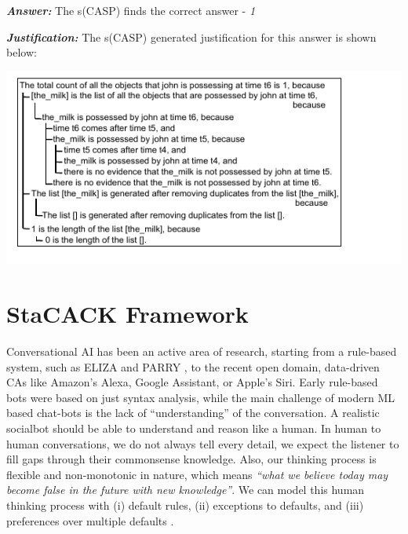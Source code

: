 \documentclass[letterpaper]{article}
\begin{document}
\smallskip
\noindent \textit{\textbf{Answer: }} The s(CASP) finds the correct answer - \textit{1}


\noindent \textit{\textbf{Justification: }}
The s(CASP) generated justification for this answer is shown below:

\smallskip

\noindent
\hbox {\hspace{-0.8em}\includegraphics [scale = 1.12]{justification.pdf}}


\section{StaCACK Framework}
Conversational AI has been an active area of research, starting from a rule-based system, such as ELIZA \cite{eliza} and PARRY \cite{parry}, to the recent open domain, data-driven CAs like Amazon's Alexa, Google Assistant, or Apple's Siri. Early rule-based bots were based on just syntax analysis, while the main challenge of modern ML based chat-bots is the lack of ``understanding'' of the conversation.
A realistic socialbot should be able to understand and reason like a human. In human to human conversations, we do not always tell every detail, we expect the listener to fill gaps through their commonsense knowledge. Also, our thinking process is flexible and non-monotonic in nature, which means \textit{``what we believe today may become false in the future with new knowledge''}. We can model this human thinking process with (i) default rules, (ii) exceptions to defaults, and (iii) preferences over multiple defaults \cite{asp}.
\end{document}
